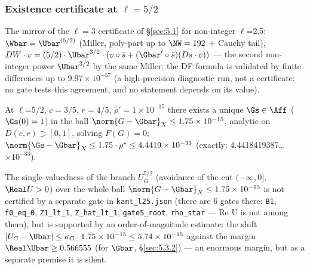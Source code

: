 \subsubsection{Existence certificate at $\ell = 5/2$}
\label{sec:5.3.3}

The mirror of the $\ell = 3$ certificate of \S\ref{sec:5.1} for non-integer $\ell$=2.5: $\Wbar = \Ubar^{(5/2)}$
(Miller, poly-part up to $\NW=192$ + Cauchy tail),
$DW\cdot v = (5/2)\cdot \Ubar^{3/2}\cdot (v\circ \bar{s} + (\Gbar'\circ
\bar{s})(Ds\cdot v))$ --- the second non-integer power $\Ubar^{3/2}$ by the
same Miller; the DF formula is validated by finite differences up to
$9.97\times 10^{-57}$ (a high-precision diagnostic run, not a certificate:
no gate tests this agreement, and no statement depends on its value).

\begin{theorem}[existence, $\ell$=5/2; \texttt{03-\allowbreak CERTIFICATES/\allowbreak pointwise/\allowbreak kant\_\allowbreak l25.json}, all 6 gates PASS as recorded there; $Y_0$ and $\rho^{\star}$ below are reassembled from the honest tail --- see ``A superseded field'']
At $\ell$=5/2, $c=3/5$, $r=4/5$, $\hat{\rho}'=1\times 10^{-15}$ there exists a
unique $\Gs \in \Aff$ ($\Gs(0)=1$) in the ball $\norm{G-\Gbar}_X \le
1.75\times 10^{-15}$, analytic on $D(c,r) \supset [0,1]$, solving $F(G)=0$;
$\norm{\Gs-\Gbar}_X \le 1.75\cdot \rho^{\star} \le 4.4419\times 10^{-33}$
(exactly: 4.4418419387\ldots$\times 10^{-33}$).
\end{theorem}

The single-valuedness of the branch $U_G^{5/2}$ (avoidance of the cut
$(-\infty,0]$, $\Real U>0$) over the whole ball $\norm{G-\Gbar}_X\le
1.75\times 10^{-15}$ is not certified by a separate gate in
\texttt{kant\_\allowbreak l25.json} (there are 6 gates there: \texttt{B1}, \texttt{f0\_eq\_0}, \texttt{Z1\_lt\_1},
\texttt{Z\_hat\_lt\_1}, \texttt{gate5\_root}, \texttt{rho\_star} --- Re U is not among them), but is
supported by an order-of-magnitude estimate: the shift
$|U_G-\Ubar|\le \kappa_G\cdot 1.75\times 10^{-15}\le 5.74\times 10^{-15}$
against the margin $\Real \Ubar\ge 0.566555$ (for $\Gbar$, \S\ref{sec:5.3.2}) --- an
enormous margin, but as a separate premise it is silent.

